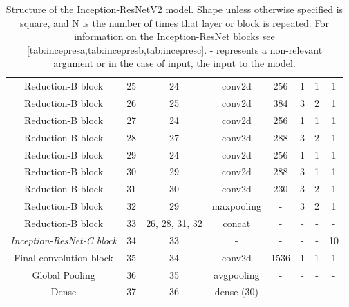 \documentclass[12pt]{article}
\numberwithin{equation}{section}
\numberwithin{figure}{section}
\begin{document}
\begin{table}[]
{\begin{tabular}{c|c|c|c|c|c|c|c}
	Reduction-B block                 & 25               & 24             & conv2d            & 256              & 1              & 1                      & 1          \\
	Reduction-B block                 & 26               & 25             & conv2d            & 384              & 3              & 2                      & 1          \\
	Reduction-B block                 & 27               & 24             & conv2d            & 256              & 1              & 1                      & 1          \\
	Reduction-B block                 & 28               & 27             & conv2d            & 288              & 3              & 2                      & 1          \\
	Reduction-B block                 & 29               & 24             & conv2d            & 256              & 1              & 1                      & 1          \\
	Reduction-B block                 & 30               & 29             & conv2d            & 288              & 3              & 1                      & 1          \\
	Reduction-B block                 & 31               & 30             & conv2d            & 230              & 3              & 2                      & 1          \\
	Reduction-B block                 & 32               & 29             & maxpooling        & -                & 3              & 2                      & 1          \\
	Reduction-B block                 & 33               & 26, 28, 31, 32 & concat            & -                & -              & -                      & -          \\\hdashline
	\textit{Inception-ResNet-C block} & 34               & 33             & -                 & -                & -              & -                      & 10         \\\hdashline
	Final convolution block           & 35               & 34             & conv2d            & 1536             & 1              & 1                      & 1          \\
	Global Pooling                    & 36               & 35             & avgpooling        & -                & -              & -                      & -          \\
	Dense                             & 37               & 36             & dense (30)        & -                & -              & - 				& -          \\ \hline
	\end{tabular}%
	}
	\caption{Structure of the Inception-ResNetV2 model. Shape unless otherwise specified is square, and N is the number of times that layer or block is repeated. For information on the Inception-ResNet blocks see \cref{tab:incepresa,tab:incepresb,tab:incepresc}.  - represents a non-relevant argument or in the case of input, the input to the model.}
	\label{tab:incepresfull}
	\end{table}
\end{document}
